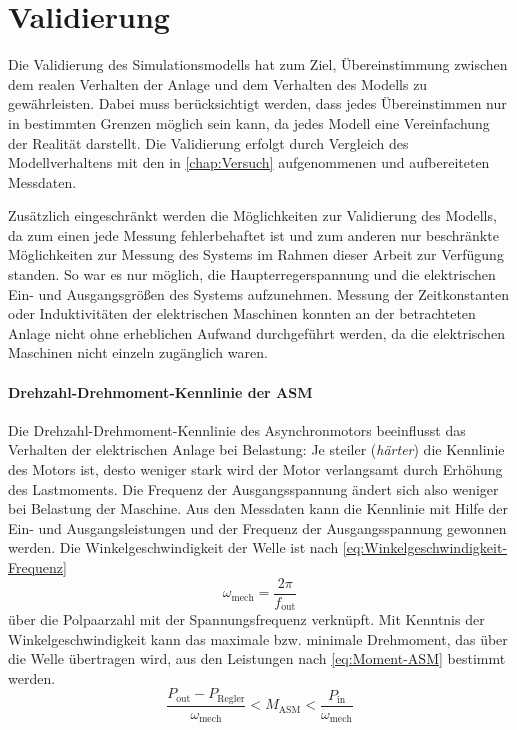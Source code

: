 \section{Validierung}
\label{sec:Validierung}
Die Validierung des Simulationsmodells hat zum Ziel, Übereinstimmung zwischen dem realen Verhalten der Anlage und dem Verhalten des Modells zu gewährleisten. Dabei muss berücksichtigt werden, dass jedes Übereinstimmen nur in bestimmten Grenzen möglich sein kann, da jedes Modell eine Vereinfachung der Realität darstellt. Die Validierung erfolgt durch Vergleich des Modellverhaltens mit den in \cref{chap:Versuch} aufgenommenen und aufbereiteten Messdaten. 

Zusätzlich eingeschränkt werden die Möglichkeiten zur Validierung des Modells, da zum einen jede Messung fehlerbehaftet ist und zum anderen nur beschränkte Möglichkeiten zur Messung des Systems im Rahmen dieser Arbeit zur Verfügung standen. So war es nur möglich, die Haupterregerspannung und die elektrischen Ein- und Ausgangsgrößen des Systems aufzunehmen. Messung der Zeitkonstanten oder Induktivitäten der elektrischen Maschinen konnten an der betrachteten Anlage nicht ohne erheblichen Aufwand durchgeführt werden, da die elektrischen Maschinen nicht einzeln zugänglich waren.

\paragraph{Drehzahl-Drehmoment-Kennlinie der ASM}
Die Drehzahl-Drehmoment-Kennlinie des Asynchronmotors beeinflusst das Verhalten der elektrischen Anlage bei Belastung: Je steiler (\emph{härter}) die Kennlinie des Motors ist, desto weniger stark wird der Motor verlangsamt durch Erhöhung des Lastmoments. Die Frequenz der Ausgangsspannung ändert sich also weniger bei Belastung der Maschine. Aus den Messdaten kann die Kennlinie mit Hilfe der Ein- und Ausgangsleistungen und der Frequenz der Ausgangsspannung gewonnen werden. Die Winkelgeschwindigkeit der Welle ist nach \cref{eq:Winkelgeschwindigkeit-Frequenz} 
\begin{equation}
    \omega_{\mathrm{mech}} = \frac{2\pi}{f_{\mathrm{out}}} \label{eq:Winkelgeschwindigkeit-Frequenz}
\end{equation}
über die Polpaarzahl mit der Spannungsfrequenz verknüpft. Mit Kenntnis der Winkelgeschwindigkeit kann das maximale bzw. minimale Drehmoment, das über die Welle übertragen wird, aus den Leistungen nach \cref{eq:Moment-ASM} bestimmt werden.
\begin{equation}
    \frac{P_{\mathrm{out}} - P_{\mathrm{Regler}}}{\omega_{\mathrm{mech}}} < M_{\mathrm{ASM}} < \frac{P_{\mathrm{in}}}{\omega_{\mathrm{mech}}} \label{eq:Moment-ASM}
\end{equation}

